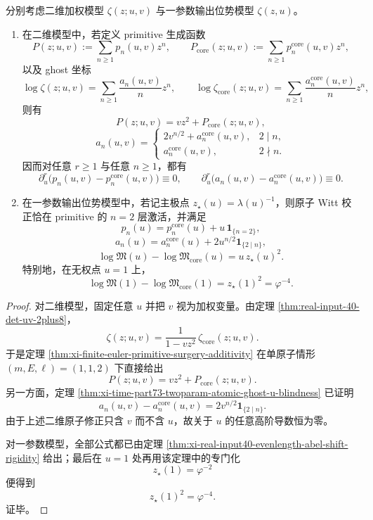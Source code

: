 \begin{corollary}\label{cor:xi-time-part73a-atomic-witt-bivariate-univariate-variable-rigidity}
分别考虑二维加权模型 \(\zeta(z;u,v)\) 与一参数输出位势模型 \(\zeta(z,u)\)。
\begin{enumerate}
  \item 在二维模型中，若定义 primitive 生成函数
  \[
  P(z;u,v):=\sum_{n\ge 1}p_n(u,v)z^n,
  \qquad
  P_{\mathrm{core}}(z;u,v):=\sum_{n\ge 1}p_n^{\mathrm{core}}(u,v)z^n,
  \]
  以及 ghost 坐标
  \[
  \log\zeta(z;u,v)=\sum_{n\ge 1}\frac{a_n(u,v)}{n}z^n,
  \qquad
  \log\zeta_{\mathrm{core}}(z;u,v)=\sum_{n\ge 1}\frac{a_n^{\mathrm{core}}(u,v)}{n}z^n,
  \]
  则有
  \[
  \boxed{\;
  P(z;u,v)=v z^2+P_{\mathrm{core}}(z;u,v),\;}
  \]
  \[
  \boxed{\;
  a_n(u,v)=
  \begin{cases}
  2v^{n/2}+a_n^{\mathrm{core}}(u,v), & 2\mid n,\\[4pt]
  a_n^{\mathrm{core}}(u,v), & 2\nmid n.
  \end{cases}\;}
  \]
  因而对任意 \(r\ge 1\) 与任意 \(n\ge 1\)，都有
  \[
  \partial_u^r\!\bigl(p_n(u,v)-p_n^{\mathrm{core}}(u,v)\bigr)\equiv 0,
  \qquad
  \partial_u^r\!\bigl(a_n(u,v)-a_n^{\mathrm{core}}(u,v)\bigr)\equiv 0.
  \]
  \item 在一参数输出位势模型中，若记主极点 \(z_\star(u)=\lambda(u)^{-1}\)，则原子 Witt 校正恰在 primitive 的 \(n=2\) 层激活，并满足
  \[
  \boxed{\;
  p_n(u)=p_n^{\mathrm{core}}(u)+u\,\mathbf 1_{\{n=2\}},\;}
  \]
  \[
  \boxed{\;
  a_n(u)=a_n^{\mathrm{core}}(u)+2u^{n/2}\mathbf 1_{\{2\mid n\}},\;}
  \]
  \[
  \boxed{\;
  \log\mathfrak M(u)-\log\mathfrak M_{\mathrm{core}}(u)=u\,z_\star(u)^2.\;}
  \]
  特别地，在无权点 \(u=1\) 上，
  \[
  \log\mathfrak M(1)-\log\mathfrak M_{\mathrm{core}}(1)
  =
  z_\star(1)^2
  =
  \varphi^{-4}.
  \]
\end{enumerate}
\end{corollary}
\begin{proof}
对二维模型，固定任意 \(u\) 并把 \(v\) 视为加权变量。由定理 \ref{thm:real-input-40-det-uv-2plus8}，
\[
\zeta(z;u,v)=\frac{1}{1-vz^2}\,\zeta_{\mathrm{core}}(z;u,v).
\]
于是定理 \ref{thm:xi-finite-euler-primitive-surgery-additivity} 在单原子情形 \((m,E,\ell)=(1,1,2)\) 下直接给出
\[
P(z;u,v)=v z^2+P_{\mathrm{core}}(z;u,v).
\]
另一方面，定理 \ref{thm:xi-time-part73-twoparam-atomic-ghost-u-blindness} 已证明
\[
a_n(u,v)-a_n^{\mathrm{core}}(u,v)=2v^{n/2}\mathbf 1_{\{2\mid n\}}.
\]
由于上述二维原子修正只含 \(v\) 而不含 \(u\)，故关于 \(u\) 的任意高阶导数恒为零。

对一参数模型，全部公式都已由定理 \ref{thm:xi-real-input40-evenlength-abel-shift-rigidity} 给出；最后在 \(u=1\) 处再用该定理中的专门化
\[
z_\star(1)=\varphi^{-2}
\]
便得到
\[
z_\star(1)^2=\varphi^{-4}.
\]
证毕。
\end{proof}

\endinput

